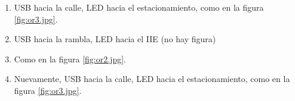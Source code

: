 \documentclass[main]{subfiles}
\begin{document}
\begin{enumerate}
\item USB hacia la calle, LED hacia el estacionamiento, como en la figura \ref{fig:or3.jpg}.
\item USB hacia la rambla, LED hacia el IIE (no hay figura)
\item Como en la figura \ref{fig:or2.jpg}.
\item Nuevamente, USB hacia la calle, LED hacia el estacionamiento, como en la figura \ref{fig:or3.jpg}.
\end{enumerate}

\begin{figure}[h!]
\vspace{-20pt}
  \\


\end{figure}
\end{document}
